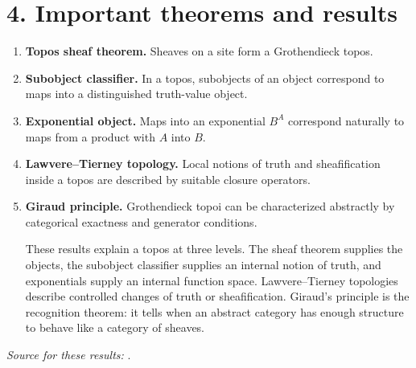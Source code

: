 \section*{4. Important theorems and results}
\begin{enumerate}[leftmargin=*,itemsep=0.35em]
\item \textbf{Topos sheaf theorem.} Sheaves on a site form a Grothendieck topos.

\item \textbf{Subobject classifier.} In a topos, subobjects of an object correspond to maps into a distinguished truth-value object.

\item \textbf{Exponential object.} Maps into an exponential $B^A$ correspond naturally to maps from a product with $A$ into $B$.

\item \textbf{Lawvere--Tierney topology.} Local notions of truth and sheafification inside a topos are described by suitable closure operators.

\item \textbf{Giraud principle.} Grothendieck topoi can be characterized abstractly by categorical exactness and generator conditions.

These results explain a topos at three levels. The sheaf theorem supplies the objects, the subobject classifier supplies an internal notion of truth, and exponentials supply an internal function space. Lawvere--Tierney topologies describe controlled changes of truth or sheafification. Giraud's principle is the recognition theorem: it tells when an abstract category has enough structure to behave like a category of sheaves.
\end{enumerate}
\noindent\emph{Source for these results:} \cite{topos_ref1}.

